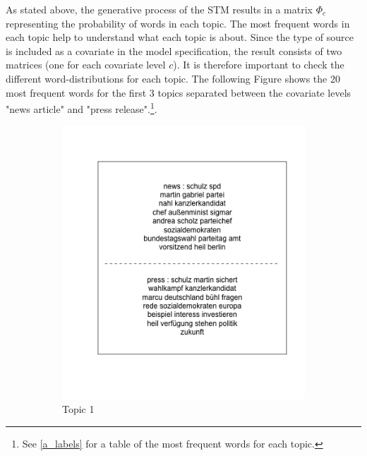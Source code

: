 \documentclass[12pt,a4paper,notitlepage]{article}
\begin{document}
As stated above, the generative process of the STM results in a matrix $\Phi_c$ representing the probability of words in each topic. The most frequent words in each topic help to understand what each topic is about. Since the type of source is included as a covariate in the model specification, the result consists of two matrices (one for each covariate level $c$). It is therefore important to check the different word-distributions for each topic. The following Figure shows the 20 most frequent words for the first 3 topics separated between the covariate levels "news article" and "press release".\footnote{See \ref{a_labels} for a table of the most frequent words for each topic.}.

\begin{figure}[H]
	\caption{Most frequent terms}
	\begin{center}
		\begin{subfigure}[normla]{0.3\textwidth}
			\includegraphics[width=\textwidth]{../figs/topiclabel/topic_label1}
			\caption{Topic 1}
		\end{subfigure}
		\begin{subfigure}[normla]{0.3\textwidth}

\end{subfigure}
\end{center}
\end{figure}
\end{document}
